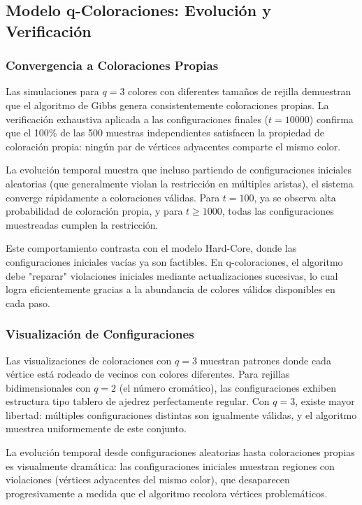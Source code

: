 \subsection{Modelo q-Coloraciones: Evolución y Verificación}

\subsubsection{Convergencia a Coloraciones Propias}

Las simulaciones para $q=3$ colores con diferentes tamaños de rejilla demuestran que el algoritmo de Gibbs genera consistentemente coloraciones propias. La verificación exhaustiva aplicada a las configuraciones finales ($t=10000$) confirma que el 100\% de las 500 muestras independientes satisfacen la propiedad de coloración propia: ningún par de vértices adyacentes comparte el mismo color.

La evolución temporal muestra que incluso partiendo de configuraciones iniciales aleatorias (que generalmente violan la restricción en múltiples aristas), el sistema converge rápidamente a coloraciones válidas. Para $t=100$, ya se observa alta probabilidad de coloración propia, y para $t \geq 1000$, todas las configuraciones muestreadas cumplen la restricción.

Este comportamiento contrasta con el modelo Hard-Core, donde las configuraciones iniciales vacías ya son factibles. En q-coloraciones, el algoritmo debe "reparar" violaciones iniciales mediante actualizaciones sucesivas, lo cual logra eficientemente gracias a la abundancia de colores válidos disponibles en cada paso.

\subsubsection{Visualización de Configuraciones}

Las visualizaciones de coloraciones con $q=3$ muestran patrones donde cada vértice está rodeado de vecinos con colores diferentes. Para rejillas bidimensionales con $q=2$ (el número cromático), las configuraciones exhiben estructura tipo tablero de ajedrez perfectamente regular. Con $q=3$, existe mayor libertad: múltiples configuraciones distintas son igualmente válidas, y el algoritmo muestrea uniformemente de este conjunto.

La evolución temporal desde configuraciones aleatorias hasta coloraciones propias es visualmente dramática: las configuraciones iniciales muestran regiones con violaciones (vértices adyacentes del mismo color), que desaparecen progresivamente a medida que el algoritmo recolora vértices problemáticos.

